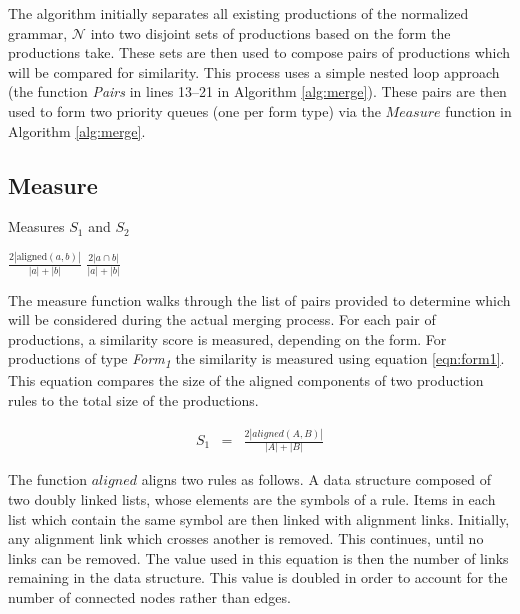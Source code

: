 \documentclass[10pt,nocc]{xrese_report}
\begin{document}
The algorithm initially separates all existing productions of the normalized grammar, $\mathcal{N}$ into two disjoint sets of productions based on the form the productions take. These sets are then used to compose pairs of productions which will be compared for similarity. This process uses a simple nested loop approach (the function \textit{Pairs} in lines 13--21 in Algorithm \ref{alg:merge}). These pairs are then used to form two priority queues (one per form type) via the $Measure$ function in Algorithm \ref{alg:merge}.

\subsection{Measure}

\begin{algorithm}[tb]
\caption{Measures $S_1$ and $S_2$}\label{alg:measures}
 \begin{algorithmic}[1]
    \State \Return $\frac{2|\textrm{aligned}(a,b)|}{|a| + |b|}$
  \EndFunction
  \Statex
    \State \Return $\frac{2|a \cap b|}{|a| + |b|}$
  \EndFunction
 \end{algorithmic}

\end{algorithm}

The measure function walks through the list of pairs provided to determine which will be considered during the actual merging process. For each pair of productions, a similarity score is measured, depending on the form. For productions of type \textit{Form\textsubscript{1}} the similarity is measured using equation \ref{eqn:form1}. This equation compares the size of the aligned components of two production rules to the total size of the productions.

\begin{eqnarray}\label{eqn:form1}
 S_1 & = & \frac{2|aligned(A,B)|}{|A| + |B|}
\end{eqnarray}

The function $aligned$ aligns two rules as follows. A data structure composed of two doubly linked lists, whose elements are the symbols of a rule. Items in each list which contain the same symbol are then linked with alignment links. Initially, any alignment link which crosses another is removed. This continues, until no links can be removed. The value used in this equation is then the number of links remaining in the data structure. This value is doubled in order to account for the number of connected nodes rather than edges.
\end{document}
